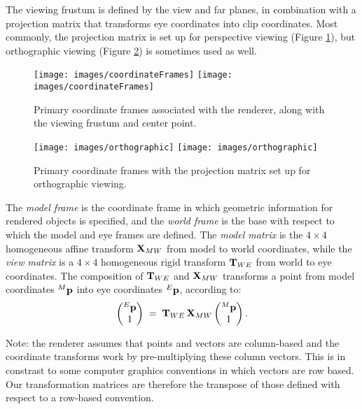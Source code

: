 The viewing frustum is defined by the view and far planes, in
combination with a projection matrix that transforms eye coordinates
into clip coordinates. Most commonly, the projection matrix is set up
for perspective viewing (Figure \ref{coordinateFrames:fig}), but
orthographic viewing (Figure \ref{orthographic:fig}) is sometimes used as
well.

%
\begin{figure}[t]
\begin{center}
\iflatexml
 \texttt{[image: images/coordinateFrames]}
\else
 \texttt{[image: images/coordinateFrames]}
\fi
\end{center}
\caption{Primary coordinate frames associated with the renderer, along with
the viewing frustum and center point.}
\label{coordinateFrames:fig}
\end{figure}
%

%
\begin{figure}[t]
\begin{center}
\iflatexml
 \texttt{[image: images/orthographic]}
\else
 \texttt{[image: images/orthographic]}
\fi
\end{center}
\caption{Primary coordinate frames with the projection matrix set up
for orthographic viewing.}
\label{orthographic:fig}
\end{figure}
%

The {\it model frame} is the coordinate frame in which geometric
information for rendered objects is specified, and the {\it world frame} is the
base with respect to which the model and eye frames are defined. The
{\it model matrix} is the $4 \times 4$ homogeneous affine transform
${\bf X}_{MW}$ from model to world coordinates, while the {\it view matrix}
is a $4 \times 4$ homogeneous rigid transform ${\bf T}_{WE}$ from world to eye
coordinates. The composition of ${\bf T}_{WE}$ and ${\bf X}_{MW}$ transforms a
point from model coordinates ${}^M{\bf p}$ into eye coordinates ${}^E{\bf p}$,
according to:
%
\begin{equation*}
\left(\begin{matrix} {}^E{\bf p} \\ 1 \end{matrix}\right) \;=\;
{\bf T}_{WE} \, {\bf X}_{MW} \left(\begin{matrix} {}^M{\bf p} \\ 1 \end{matrix}\right).
\end{equation*}
%

\begin{sideblock}
Note: the renderer assumes that points and vectors are column-based
and the coordinate transforms work by pre-multiplying these column
vectors. This is in constrast to some computer graphics conventions in
which vectors are row based. Our transformation matrices are therefore
the transpose of those defined with respect to a row-based convention.
\end{sideblock}

